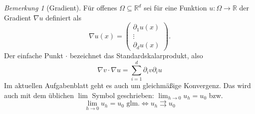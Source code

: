 \documentclass{scrartcl}
\newcommand{\reals}{\mathbb{R}}
\theoremstyle{remark}
\newtheorem {remark} {Bemerkung}
\begin{document}

  \begin{remark}[Gradient]
    Für offenes $\Omega \subseteq \reals^d$ sei für eine Funktion $u \colon \Omega \to \reals$ der Gradient $\nabla u$ definiert als
    \begin{equation}
      \nabla u (x) =
      \begin{pmatrix} %
        \partial_1 u(x) \\
        \vdots \\
        \partial_d u(x)
      \end{pmatrix}.
    \end{equation}
    Der einfache Punkt $\cdot$ bezeichnet das Standardskalarprodukt, also
    \begin{equation}
      \nabla v \cdot \nabla u = \sum_{i=1}^{d} \partial_i v \partial_i u
    \end{equation}
    Im aktuellen Aufgabenblatt geht es auch um gleichmäßige Konvergenz. Das wird auch mit dem üblichen $\lim$ Symbol geschrieben: $\lim_{h \to 0} u_h = u_0$ bzw.\
    \begin{equation}
      \lim_{h \to 0} u_h = u_0 \text{ glm.} \iff u_h \rightrightarrows u_0
    \end{equation}
  \end{remark}
\end{document}
